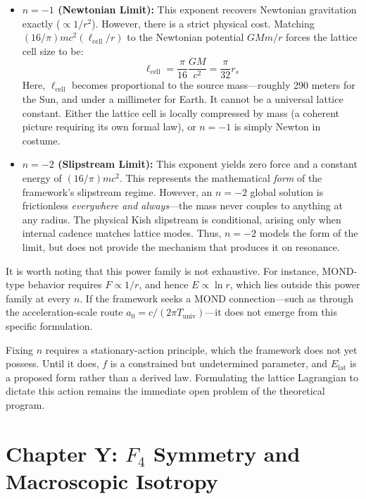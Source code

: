 \documentclass[11pt, letterpaper, openany]{book}
\begin{document}
\begin{itemize}
    \item \textbf{$n = -1$ (Newtonian Limit):} This exponent recovers Newtonian gravitation exactly ($\propto 1/r^2$). However, there is a strict physical cost. Matching $(16/\pi) m c^2 (\ell_{\text{cell}}/r)$ to the Newtonian potential $G M m / r$ forces the lattice cell size to be:
    \[
    \ell_{\text{cell}} = \frac{\pi}{16} \frac{GM}{c^2} = \frac{\pi}{32} r_s
    \]
    Here, $\ell_{\text{cell}}$ becomes proportional to the source mass—roughly 290 meters for the Sun, and under a millimeter for Earth. It cannot be a universal lattice constant. Either the lattice cell is locally compressed by mass (a coherent picture requiring its own formal law), or $n = -1$ is simply Newton in costume.
    
    \item \textbf{$n = -2$ (Slipstream Limit):} This exponent yields zero force and a constant energy of $(16/\pi)mc^2$. This represents the mathematical \textit{form} of the framework's slipstream regime. However, an $n=-2$ global solution is frictionless \textit{everywhere and always}—the mass never couples to anything at any radius. The physical Kish slipstream is conditional, arising only when internal cadence matches lattice modes. Thus, $n=-2$ models the form of the limit, but does not provide the mechanism that produces it on resonance.
\end{itemize}

It is worth noting that this power family is not exhaustive. For instance, MOND-type behavior requires $F \propto 1/r$, and hence $E \propto \ln r$, which lies outside this power family at every $n$. If the framework seeks a MOND connection—such as through the acceleration-scale route $a_0 = c/(2\pi T_{\text{univ}})$—it does not emerge from this specific formulation.

Fixing $n$ requires a stationary-action principle, which the framework does not yet possess. Until it does, $f$ is a constrained but undetermined parameter, and $E_{\mathrm{lat}}$ is a proposed form rather than a derived law. Formulating the lattice Lagrangian to dictate this action remains the immediate open problem of the theoretical program.

\section*{Chapter Y: $F_4$ Symmetry and Macroscopic Isotropy}
\end{document}
